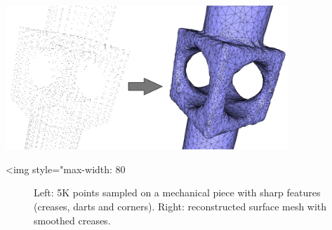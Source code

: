 \begin{center}
    \begin{ccTexOnly}
        \includegraphics[width=0.8\textwidth]{Surface_reconstruction_points_3/sharp_features}
    \end{ccTexOnly}
    \begin{ccHtmlOnly}
        <img style="max-width: 80%
    \end{ccHtmlOnly}
    \begin{figure}[h]
        \caption{Left: 5K points sampled on a mechanical piece with
                 sharp features (creases, darts and corners).
                 Right: reconstructed surface mesh with smoothed
                 creases.}
        \label{Surface_reconstruction_points_3-fig-sharp_features}
    \end{figure}
\end{center}


